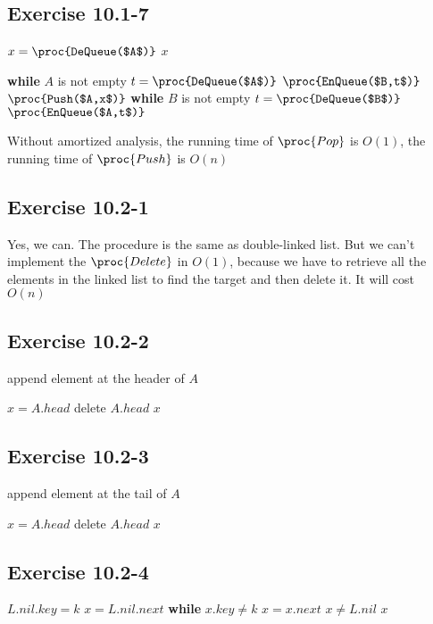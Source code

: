 \documentclass[12pt]{article}
\theoremstyle{definition}
\theoremstyle{remark}
\begin{document}
\subsection*{Exercise 10.1-7}
\begin{codebox}
\li $x=\proc{DeQueue($A$)}$
\li \Return $x$
\end{codebox}
\begin{codebox}
\li \textbf{while} $A$ is not empty
\li \quad $t=\proc{DeQueue($A$)}$
\li \quad $\proc{EnQueue($B,t$)}$
\li $\proc{Push($A,x$)}$
\li \textbf{while} $B$ is not empty
\li \quad $t=\proc{DeQueue($B$)}$
\li \quad $\proc{EnQueue($A,t$)}$
\end{codebox}
Without amortized analysis, the running time of $\proc{Pop}$ is $O(1)$, the running time of $\proc{Push}$ is $O(n)$
\subsection*{Exercise 10.2-1}
Yes, we can. The procedure is the same as double-linked list. But we can't implement the $\proc{Delete}$ in $O(1)$, because we have to retrieve all the elements in the linked list to find the target and then delete it. It will cost $O(n)$
\subsection*{Exercise 10.2-2}
\begin{codebox}
\li append element at the header of $A$
\end{codebox}
\begin{codebox}
\li $x=A.head$
\li delete $A.head$
\li \Return $x$
\end{codebox}
\subsection*{Exercise 10.2-3}
\begin{codebox}
\li append element at the tail of $A$
\end{codebox}
\begin{codebox}
\li $x=A.head$
\li delete $A.head$
\li \Return $x$
\end{codebox}
\subsection*{Exercise 10.2-4}
\begin{codebox}
\li $L.nil.key=k$
\li $x=L.nil.next$
\li \textbf{while} $x.key\not=k$
\li \quad $x=x.next$
\li \If $x\not=L.nil$
\li \quad \Return $x$
\end{codebox}
\end{document}
